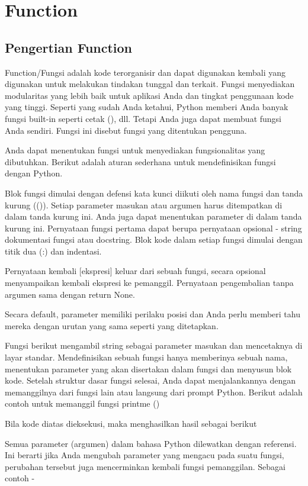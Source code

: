 \section{Function}
\subsection{Pengertian Function}
Function/Fungsi adalah kode terorganisir dan dapat digunakan kembali yang digunakan untuk melakukan tindakan tunggal dan terkait. 
Fungsi menyediakan modularitas yang lebih baik untuk aplikasi Anda dan tingkat penggunaan kode yang tinggi. Seperti yang sudah Anda ketahui, 
Python memberi Anda banyak fungsi built-in seperti cetak (), dll. Tetapi Anda juga dapat membuat fungsi Anda sendiri. 
Fungsi ini disebut fungsi yang ditentukan pengguna.

Anda dapat menentukan fungsi untuk menyediakan fungsionalitas yang dibutuhkan. Berikut adalah aturan sederhana untuk mendefinisikan fungsi dengan Python. 

Blok fungsi dimulai dengan defensi kata kunci diikuti oleh nama fungsi dan tanda kurung (()). 
Setiap parameter masukan atau argumen harus ditempatkan di dalam tanda kurung ini. Anda juga dapat menentukan parameter di dalam tanda kurung ini. 
Pernyataan fungsi pertama dapat berupa pernyataan opsional - string dokumentasi fungsi atau docstring. 
Blok kode dalam setiap fungsi dimulai dengan titik dua (:) dan indentasi. 

Pernyataan kembali [ekspresi] keluar dari sebuah fungsi, secara opsional menyampaikan kembali ekspresi ke pemanggil. Pernyataan pengembalian tanpa argumen sama dengan return None.

Secara default, parameter memiliki perilaku posisi dan Anda perlu memberi tahu mereka dengan urutan yang sama seperti yang ditetapkan.

Fungsi berikut mengambil string sebagai parameter masukan dan mencetaknya di layar standar.
Mendefinisikan sebuah fungsi hanya memberinya sebuah nama, menentukan parameter yang akan disertakan dalam fungsi dan menyusun blok kode. Setelah struktur dasar fungsi selesai, Anda dapat menjalankannya dengan memanggilnya dari fungsi lain atau langsung dari prompt Python. Berikut adalah contoh untuk memanggil fungsi printme ()

Bila kode diatas dieksekusi, maka menghasilkan hasil sebagai berikut 

Semua parameter (argumen) dalam bahasa Python dilewatkan dengan referensi. Ini berarti jika Anda mengubah parameter yang mengacu pada suatu fungsi, perubahan tersebut juga mencerminkan kembali fungsi pemanggilan. Sebagai contoh - \par

